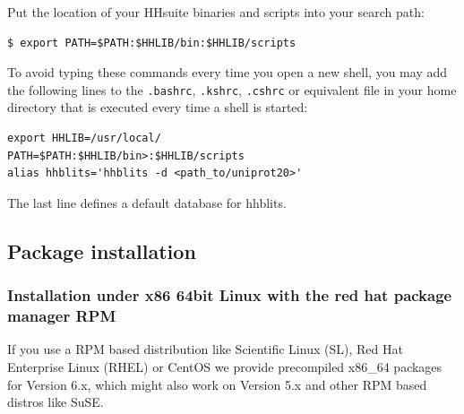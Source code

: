 \documentclass[11pt,a4paper]{article}
\begin{document}
\begin{enum}
Put the location of your HHsuite binaries and scripts into your search path:
\begin{verbatim}
$ export PATH=$PATH:$HHLIB/bin:$HHLIB/scripts
\end{verbatim}

To avoid typing these commands every time you open a new shell, you may add the following lines to the \verb`.bashrc`, \verb`.kshrc`, \verb`.cshrc` or equivalent file in your home directory that is executed every time a shell is started:
\begin{verbatim}
export HHLIB=/usr/local/
PATH=$PATH:$HHLIB/bin>:$HHLIB/scripts
alias hhblits='hhblits -d <path_to/uniprot20>'
\end{verbatim}
The last line defines a default database for hhblits. 
\vspace{2mm}

\end{enum}

\subsection{Package installation}

\subsubsection*{Installation under x86 64bit Linux with the red hat package manager RPM}

If you use a RPM based distribution like Scientific Linux (SL), Red Hat Enterprise Linux (RHEL) or CentOS we provide precompiled x86\_64 packages for
Version 6.x, which might also work on Version 5.x and other RPM based distros
like SuSE.
\end{document}

